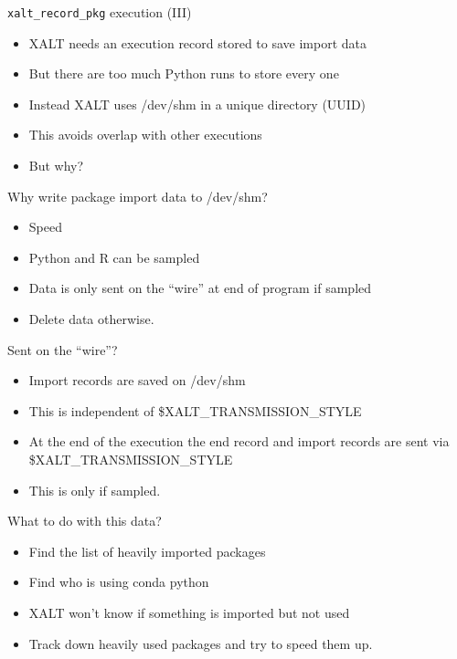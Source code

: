 \documentclass{beamer}
\begin{document}
\begin{frame}{\texttt{xalt\_record\_pkg} execution (III)}
  \begin{itemize}
    \item XALT needs an execution record stored to save import data
    \item But there are too much Python runs to store every one
    \item Instead XALT uses /dev/shm in a unique directory (UUID)
    \item This avoids overlap with other executions
    \item But why?
  \end{itemize}
\end{frame}

\begin{frame}{Why write package import data to /dev/shm?}
  \begin{itemize}
    \item Speed
    \item Python and R can be sampled
    \item Data is only sent on the ``wire'' at end of program if sampled
    \item Delete data otherwise.
  \end{itemize}
\end{frame}

\begin{frame}{Sent on the ``wire''?}
  \begin{itemize}
    \item Import records are saved on /dev/shm
    \item This is independent of \$XALT\_TRANSMISSION\_STYLE
    \item At the end of the execution the end record and import
      records are sent via \$XALT\_TRANSMISSION\_STYLE
    \item This is only if sampled.
  \end{itemize}
\end{frame}

\begin{frame}{What to do with this data?}
  \begin{itemize}
    \item Find the list of heavily imported packages
    \item Find who is using conda python
    \item XALT won't know if something is imported but not used
    \item Track down heavily used packages and try to speed them up.
  \end{itemize}
\end{frame}
\end{document}
